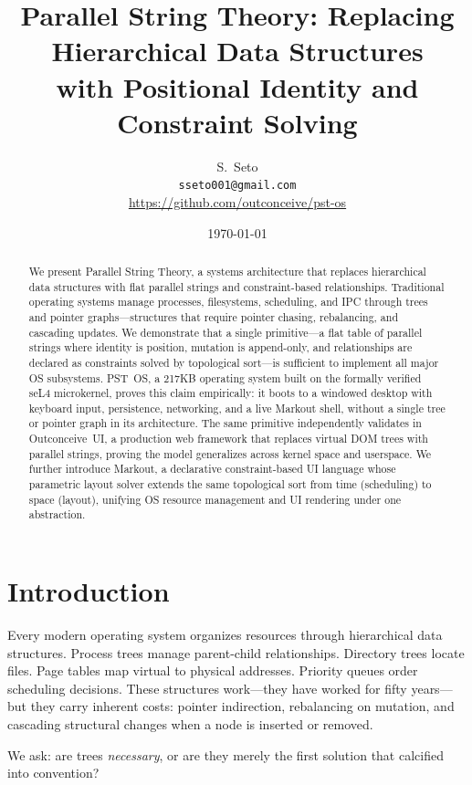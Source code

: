 \documentclass[11pt,a4paper]{article}
\title{Parallel String Theory: Replacing Hierarchical Data Structures\\with Positional Identity and Constraint Solving}
\author{
  S.\ Seto\\
  \texttt{sseto001@gmail.com}\\
  \url{https://github.com/outconceive/pst-os}
}
\date{\today}
\begin{document}
\maketitle

\begin{abstract}
We present Parallel String Theory, a systems architecture that replaces hierarchical data structures with flat parallel strings and constraint-based relationships. Traditional operating systems manage processes, filesystems, scheduling, and IPC through trees and pointer graphs---structures that require pointer chasing, rebalancing, and cascading updates. We demonstrate that a single primitive---a flat table of parallel strings where identity is position, mutation is append-only, and relationships are declared as constraints solved by topological sort---is sufficient to implement all major OS subsystems. PST~OS, a 217KB operating system built on the formally verified seL4 microkernel, proves this claim empirically: it boots to a windowed desktop with keyboard input, persistence, networking, and a live Markout shell, without a single tree or pointer graph in its architecture. The same primitive independently validates in Outconceive~UI, a production web framework that replaces virtual DOM trees with parallel strings, proving the model generalizes across kernel space and userspace. We further introduce Markout, a declarative constraint-based UI language whose parametric layout solver extends the same topological sort from time (scheduling) to space (layout), unifying OS resource management and UI rendering under one abstraction.
\end{abstract}

\section{Introduction}

Every modern operating system organizes resources through hierarchical data structures. Process trees manage parent-child relationships. Directory trees locate files. Page tables map virtual to physical addresses. Priority queues order scheduling decisions. These structures work---they have worked for fifty years---but they carry inherent costs: pointer indirection, rebalancing on mutation, and cascading structural changes when a node is inserted or removed.

We ask: are trees \emph{necessary}, or are they merely the first solution that calcified into convention?
\end{document}
